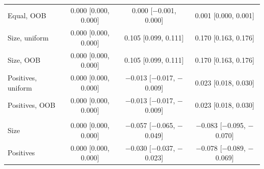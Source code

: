 \begin{tabular}{lccc}
Equal, OOB & 0.000 [0.000, 0.000] & 0.000 [$-$0.001, 0.000] & 0.001 [0.000, 0.001] \\
Size, uniform & 0.000 [0.000, 0.000] & 0.105 [0.099, 0.111] & 0.170 [0.163, 0.176] \\
Size, OOB & 0.000 [0.000, 0.000] & 0.105 [0.099, 0.111] & 0.170 [0.163, 0.176] \\
Positives, uniform & 0.000 [0.000, 0.000] & $-$0.013 [$-$0.017, $-$0.009] & 0.023 [0.018, 0.030] \\
Positives, OOB & 0.000 [0.000, 0.000] & $-$0.013 [$-$0.017, $-$0.009] & 0.023 [0.018, 0.030] \\
\addlinespace
\multicolumn{4}{@{}l}{\textit{Heart, XGBoost}} \\
Size & 0.000 [0.000, 0.000] & $-$0.057 [$-$0.065, $-$0.049] & $-$0.083 [$-$0.095, $-$0.070] \\
Positives & 0.000 [0.000, 0.000] & $-$0.030 [$-$0.037, $-$0.023] & $-$0.078 [$-$0.089, $-$0.069] \\
\bottomrule
\end{tabular}

